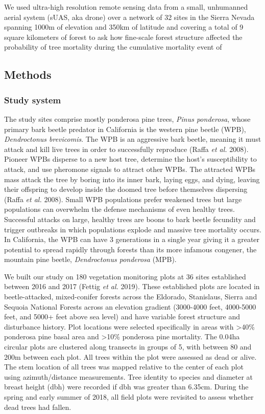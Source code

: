 \documentclass[]{article}
\begin{document}
We used ultra-high resolution remote sensing data from a small,
unhumanned aerial system (sUAS, aka drone) over a network of 32 sites in
the Sierra Nevada spanning 1000m of elevation and 350km of latitude and
covering a total of 9 square kilometers of forest to ask how fine-scale
forest structure affected the probability of tree mortality during the
cumulative mortality event of

\subsection{Methods}\label{methods}

\subsubsection{Study system}\label{study-system}

The study sites comprise mostly ponderosa pine trees, \emph{Pinus
ponderosa}, whose primary bark beetle predator in California is the
western pine beetle (WPB), \emph{Dendroctonus brevicomis}. The WPB is an
aggressive bark beetle, meaning it must attack and kill live trees in
order to successfully reproduce (Raffa \emph{et al.} 2008). Pioneer WPBs
disperse to a new host tree, determine the host's susceptibility to
attack, and use pheromone signals to attract other WPBs. The attracted
WPBs mass attack the tree by boring into its inner bark, laying eggs,
and dying, leaving their offspring to develop inside the doomed tree
before themselves dispersing (Raffa \emph{et al.} 2008). Small WPB
populations prefer weakened trees but large populations can overwhelm
the defense mechanisms of even healthy trees. Successful attacks on
large, healthy trees are boons to bark beetle fecundity and trigger
outbreaks in which populations explode and massive tree mortality
occurs. In California, the WPB can have 3 generations in a single year
giving it a greater potential to spread rapidly through forests than its
more infamous congener, the mountain pine beetle, \emph{Dendroctonus
ponderosa} (MPB).

We built our study on 180 vegetation monitoring plots at 36 sites
established between 2016 and 2017 (Fettig \emph{et al.} 2019). These
established plots are located in beetle-attacked, mixed-conifer forests
across the Eldorado, Stanislaus, Sierra and Sequoia National Forests
across an elevation gradient (3000-4000 feet, 4000-5000 feet, and 5000+
feet above sea level) and have variable forest structure and disturbance
history. Plot locations were selected specifically in areas with
\textgreater{}40\% ponderosa pine basal area and \textgreater{}10\%
ponderosa pine mortality. The 0.04ha circular plots are clustered along
transects in groups of 5, with between 80 and 200m between each plot.
All trees within the plot were assessed as dead or alive. The stem
location of all trees was mapped relative to the center of each plot
using azimuth/distance measurements. Tree identity to species and
diameter at breast height (dbh) were recorded if dbh was greater than
6.35cm. During the spring and early summer of 2018, all field plots were
revisited to assess whether dead trees had fallen.
\end{document}

